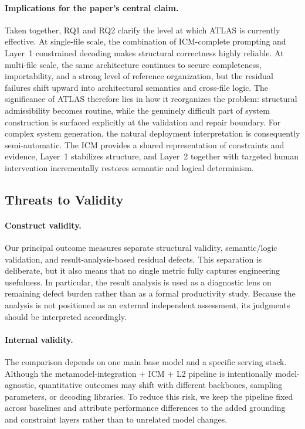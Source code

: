 \documentclass[acmlarge,nonacm]{acmart}
\theoremstyle{acmplain}
\theoremstyle{acmdefinition}
\begin{document}
\paragraph{Implications for the paper's central claim.}
Taken together, RQ1 and RQ2 clarify the level at which ATLAS is currently effective. At single-file scale, the combination of ICM-complete prompting and Layer~1 constrained decoding makes structural correctness highly reliable. At multi-file scale, the same architecture continues to secure completeness, importability, and a strong level of reference organization, but the residual failures shift upward into architectural semantics and cross-file logic. The significance of ATLAS therefore lies in how it reorganizes the problem: structural admissibility becomes routine, while the genuinely difficult part of system construction is surfaced explicitly at the validation and repair boundary. For complex system generation, the natural deployment interpretation is consequently semi-automatic. The ICM provides a shared representation of constraints and evidence, Layer~1 stabilizes structure, and Layer~2 together with targeted human intervention incrementally restores semantic and logical determinism.

\subsection{Threats to Validity}
\label{sec:threats}
\paragraph{Construct validity.} Our principal outcome measures separate structural validity, semantic/logic validation, and result-analysis-based residual defects. This separation is deliberate, but it also means that no single metric fully captures engineering usefulness. In particular, the result analysis is used as a diagnostic lens on remaining defect burden rather than as a formal productivity study. Because the analysis is not positioned as an external independent assessment, its judgments should be interpreted accordingly.

\paragraph{Internal validity.} The comparison depends on one main base model and a specific serving stack. Although the metamodel-integration + ICM + L2 pipeline is intentionally model-agnostic, quantitative outcomes may shift with different backbones, sampling parameters, or decoding libraries. To reduce this risk, we keep the pipeline fixed across baselines and attribute performance differences to the added grounding and constraint layers rather than to unrelated model changes.
\end{document}
